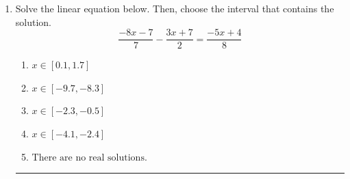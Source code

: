 \documentclass[14pt]{extbook}
\newcommand{\litem}[1]{\item#1\hspace*{-1cm}\rule{\textwidth}{0.4pt}}
\begin{document}
\begin{enumerate}
{\begin{enumerate}[label=\Alph*.]
\end{enumerate} }
\litem{
Solve the linear equation below. Then, choose the interval that contains the solution.\[ \frac{-8x -7}{7} - \frac{3x + 7}{2} = \frac{-5x + 4}{8} \]\begin{enumerate}[label=\Alph*.]
\item \( x \in [0.1, 1.7] \)
\item \( x \in [-9.7, -8.3] \)
\item \( x \in [-2.3, -0.5] \)
\item \( x \in [-4.1, -2.4] \)
\item \( \text{There are no real solutions.} \)

\end{enumerate} }
\end{enumerate}
\end{document}
